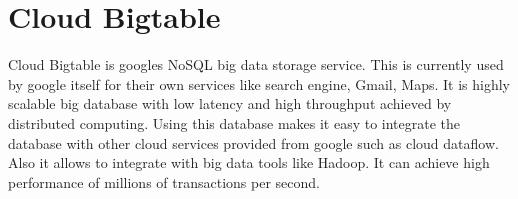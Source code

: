 \section{Cloud Bigtable}

Cloud Bigtable is googles NoSQL big data storage service. This is currently
used by google itself for their own services like search engine, Gmail, Maps.
It is highly scalable big database with low latency and high throughput achieved
by distributed computing. Using this database makes it easy to integrate the
database with other cloud services provided from google such as cloud dataflow.
Also it allows to integrate with big data tools like Hadoop. It can achieve high
 performance of millions of transactions per second.
~\cite{hid-sp18-502-GoogleCloudBigtable}



